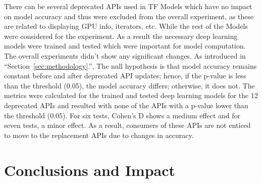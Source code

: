 \documentclass[12pt,letterpaper]{report}
\begin{document}
There can be several deprecated APIs used in TF Models which have no impact on model accuracy and thus were excluded from the overall experiment, as these are related to displaying GPU info, iterators, etc. While the rest of the Models were considered for the experiment. As a result the necessary deep learning models were trained and tested which were important for model computation. The overall experiments didn't show any significant changes. As introduced in ``Section~\ref{sec:methodology}.'', The null hypothesis is that model accuracy remains constant before and after deprecated API updates; hence, if the p-value is less than the threshold (0.05), the model accuracy differs; otherwise, it does not. The metrics were calculated for the trained and tested deep learning models for the 12 deprecated APIs and resulted with none of the APIs with a p-value lower than the threshold (0.05). For six tests, Cohen's D shows a medium effect and for seven tests, a minor effect. As a result, consumers of these APIs are not enticed to move to the replacement APIs due to changes in accuracy.

\chapter{Conclusions and Impact}
\end{document}
